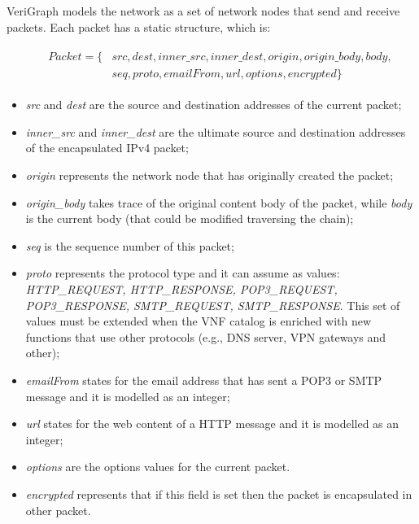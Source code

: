 VeriGraph models the network as a set of network nodes that send and receive packets. Each packet has a static structure, which is:
\begin{figure}[h]
	{\footnotesize
		\begin{subequations}
			\begin{align}
				\begin{split}
				\label{fields}
					Packet = \{& src, dest,inner\_src,inner\_dest, origin, origin\_body, body,\\
					&   seq, proto, emailFrom, url, options, encrypted\}
				\end{split}
			\end{align}
		\end{subequations}}
	\end{figure}
\begin{itemize}
	\item \textit{src} and \textit{dest} are the source and destination addresses of the current packet;
		\item \textit{inner\_src} and \textit{inner\_dest} are the ultimate source and destination addresses of the encapsulated IPv4 packet;
	\item \textit{origin} represents the network node that has originally created the packet;
	\item \textit{origin\_body} takes trace of the original content body of the packet, while \textit{body} is the current body (that could be modified traversing the chain);
	\item \textit{seq} is the sequence number of this packet;
	\item \textit{proto} represents the protocol type and it can assume as values: \textit{HTTP\_REQUEST, HTTP\_RESPONSE, POP3\_REQUEST, POP3\_RESPONSE, SMTP\_REQUEST, SMTP\_RESPONSE}. This set of values must be extended when the VNF catalog is enriched with new functions that use other protocols (e.g., DNS server, VPN gateways and other);
	\item \textit{emailFrom} states for the email address that has sent a POP3 or SMTP message and it is modelled as an integer;
	\item\textit{url} states for the web content of a HTTP message and it is modelled as an integer;
	\item \textit{options} are the options values for the current packet.
		\item \textit{encrypted} represents that if this field is set then the packet is encapsulated in other packet.
\end{itemize}
